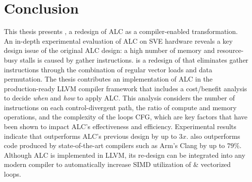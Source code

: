 \chapter{Conclusion}
\label{chap:conclusion}

This thesis presents \ALCdp, a redesign of ALC as a compiler-enabled transformation.
An in-depth experimental evaluation of ALC on SVE hardware reveals a key design issue of the original ALC design: a high number of memory and resource-busy stalls is caused by gather instructions.
\ALCdp is a redesign of \ALC that eliminates gather instructions through the combination of regular vector loads and data permutation.
The thesis contributes an implementation of ALC in the production-ready LLVM compiler framework that includes a cost/benefit analysis to decide \emph{when} and \emph{how} to apply ALC.
This analysis considers the number of instructions on each control-divergent path, the ratio of compute and memory operations, and the complexity of the loops CFG, which are key factors that have been shown to impact ALC's effectiveness and efficiency.
Experimental results indicate that \ALCdp outperforms ALC's previous design by up to $3x$.
\ALCdp also outperforms \ifconverted code produced by state-of-the-art compilers such as Arm's Clang by up to $79\%$.
Although ALC is implemented in LLVM, its re-design can be integrated into any modern compiler to automatically increase SIMD utilization of \ifconverted \& vectorized loops.